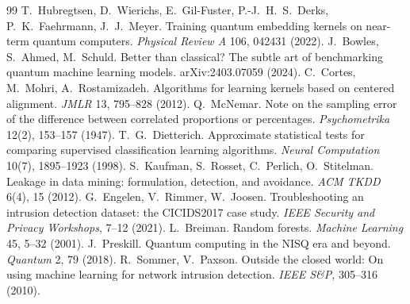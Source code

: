 \begin{thebibliography}{99}
 T.~Hubregtsen, D.~Wierichs, E.~Gil-Fuster, P.-J.~H.~S.~Derks, P.~K.~Faehrmann,
  J.~J.~Meyer. Training quantum embedding kernels on near-term quantum computers.
  \emph{Physical Review A} 106, 042431 (2022).
 J.~Bowles, S.~Ahmed, M.~Schuld. Better than classical? The subtle art of
  benchmarking quantum machine learning models. arXiv:2403.07059 (2024).
 C.~Cortes, M.~Mohri, A.~Rostamizadeh. Algorithms for learning kernels based on
  centered alignment. \emph{JMLR} 13, 795--828 (2012).
 Q.~McNemar. Note on the sampling error of the difference between correlated
  proportions or percentages. \emph{Psychometrika} 12(2), 153--157 (1947).
 T.~G.~Dietterich. Approximate statistical tests for comparing supervised
  classification learning algorithms. \emph{Neural Computation} 10(7), 1895--1923 (1998).
 S.~Kaufman, S.~Rosset, C.~Perlich, O.~Stitelman. Leakage in data mining:
  formulation, detection, and avoidance. \emph{ACM TKDD} 6(4), 15 (2012).
 G.~Engelen, V.~Rimmer, W.~Joosen. Troubleshooting an intrusion detection
  dataset: the CICIDS2017 case study. \emph{IEEE Security and Privacy Workshops}, 7--12 (2021).
 L.~Breiman. Random forests. \emph{Machine Learning} 45, 5--32 (2001).
 J.~Preskill. Quantum computing in the NISQ era and beyond. \emph{Quantum} 2, 79 (2018).
 R.~Sommer, V.~Paxson. Outside the closed world: On using machine learning for
  network intrusion detection. \emph{IEEE S\&P}, 305--316 (2010).
\end{thebibliography}
